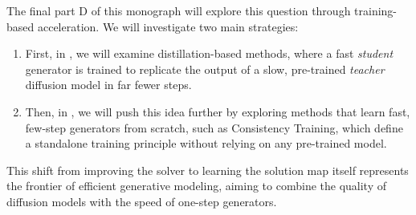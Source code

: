 The final part D of this monograph will explore this question through training-based acceleration. We will investigate two main strategies:
\begin{enumerate}
    \item First, in , we will examine distillation-based methods, where a fast \textit{student} generator is trained to replicate the output of a slow, pre-trained \textit{teacher} diffusion model in far fewer steps.
    \item Then, in , we will push this idea further by exploring methods that learn fast, few-step generators from scratch, such as Consistency Training, which define a standalone training principle without relying on any pre-trained model.
\end{enumerate}

This shift from improving the solver to learning the solution map itself represents the frontier of efficient generative modeling, aiming to combine the quality of diffusion models with the speed of one-step generators. 




\clearpage
\newpage

